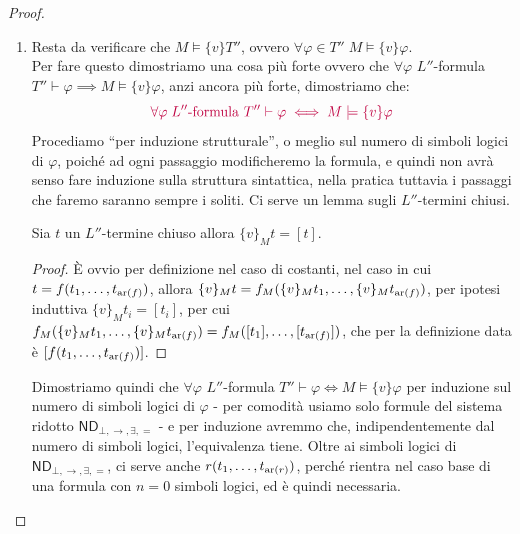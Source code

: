 \begin{proof}
\begin{enumerate}
        Se $f$ è un simbolo di funzione, allora:
        \[[t] = [f_M([t_1],\ldots,[t_{\ar(f)}])] \overset{\text{def}}{\iff} T'' \vdash f(t_1,\ldots,t_{\ar(f)}) = t \]
        anche questa definizione è ben posta, se $[t_i] = [t_i']$ e $[t] = [t']$, allora, di nuovo iterando El$_=$, ottengo $T'' \vdash f(t_1',\ldots,t_{\ar(f)}') = t'$ - e viceversa.\\
        Definiamo infine la valutazione $v$ che ci serve come $v(x_i) := [c_i]$.
        \item Resta da verificare che $M \models \{v\}T''$, ovvero $\forall \varphi \in T'' \; M \models \{v\}\varphi$.\\
        Per fare questo dimostriamo una cosa più forte ovvero che $\forall \varphi$ $L''$-formula $T'' \vdash \varphi \implies M \models \{v\}\varphi$, anzi ancora più forte, dimostriamo che:
        \[\textcolor{purple}{\forall \varphi \; \text{$L''$-formula } T'' \vdash \varphi \iff M \models \{v\}\varphi}\]
        Procediamo ``per induzione strutturale'', o meglio sul numero di simboli logici di $\varphi$, poiché ad ogni passaggio modificheremo la formula, e quindi non avrà senso fare induzione sulla struttura sintattica, nella pratica tuttavia i passaggi che faremo saranno sempre i soliti.
        Ci serve un lemma sugli $L''$-termini chiusi.
        \begin{lemma}
            Sia $t$ un $L''$-termine chiuso allora $\{v\}_M t = [t]$. 
        \end{lemma}
        \begin{proof}
            È ovvio per definizione nel caso di costanti, nel caso in cui $t = f(t_1,\ldots,t_{\operatorname{ar}(f)})$, allora $\{v\}_M t = f_M(\{v\}_M t_1,\ldots,\{v\}_M t_{\operatorname{ar}(f)})$, per ipotesi induttiva $\{v\}_M t_i = [t_i]$, per cui $f_M(\{v\}_M t_1,\ldots,\{v\}_M t_{\operatorname{ar}(f)}) = f_M([t_1],\ldots,[t_{\operatorname{ar}(f)}])$, che per la definizione data è $[f(t_1,\ldots,t_{\operatorname{ar}(f)})]$.
        \end{proof}
        Dimostriamo quindi che $\forall \varphi$ $L''$-formula $T'' \vdash \varphi \iff M \models \{v\}\varphi$ per induzione sul numero di simboli logici di $\varphi$ - per comodità usiamo solo formule del sistema ridotto $\mathsf{ND}_{\bot,\to,\exists,=}$ - e per induzione avremmo che, indipendentemente dal numero di simboli logici, l'equivalenza tiene. Oltre ai 
        simboli logici di $\mathsf{ND}_{\bot,\to,\exists,=}$, ci serve anche $r(t_1,\ldots,t_{\operatorname{ar}(r)})$, perché rientra nel caso base di una formula con $n = 0$ simboli logici, ed è quindi necessaria.\\

\end{enumerate}
\end{proof}
